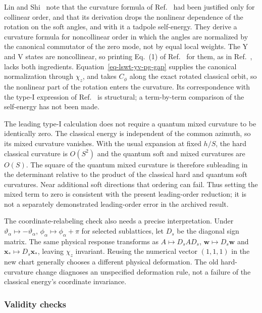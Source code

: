 Lin and Shi~\cite{lin2025} note that the curvature formula of
Ref.~\cite{rau2018} had been justified only for collinear order, and
that its derivation drops the nonlinear dependence of the rotation on
the soft angles, and with it a tadpole self-energy. They derive a
curvature formula for noncollinear order in which the angles are
normalized by the canonical commutator of the zero mode, not by equal
local weights. The Y and V states are noncollinear, so printing
Eq.~(1) of Ref.~\cite{rau2018} for them, as in Ref.~\cite{park2026},
lacks both ingredients. Equation~\eqref{eq-lswt-yv-pg-gap} supplies the
canonical normalization through \(\chi_z\), and takes \(C_\phi\) along
the exact rotated classical orbit, so the nonlinear part of the
rotation enters the curvature. Its correspondence with the type-I
expression of Ref.~\cite{lin2025} is structural; a term-by-term
comparison of the self-energy has not been made.

The leading type-I calculation does not require a quantum mixed
curvature to be identically zero. The classical energy is independent of
the common azimuth, so its mixed curvature vanishes. With the usual
expansion at fixed \(h/S\), the hard classical curvature is \(O(S^2)\)
and the quantum soft and mixed curvatures are \(O(S)\). The square of
the quantum mixed curvature is therefore subleading in the determinant
relative to the product of the classical hard and quantum soft
curvatures. Near additional soft directions that ordering can fail. Thus
setting the mixed term to zero is consistent with the present
leading-order reduction; it is not a separately demonstrated
leading-order error in the archived result.

The coordinate-relabeling check also needs a precise interpretation.
Under \(\vartheta_\alpha\mapsto-\vartheta_\alpha\),
\(\phi_\alpha\mapsto\phi_\alpha+\pi\) for selected sublattices, let
\(D_s\) be the diagonal sign matrix. The same physical response
transforms as \(A\mapsto D_sAD_s\), \(\mathbf w\mapsto D_s\mathbf w\)
and \(\mathbf x_*\mapsto D_s\mathbf x_*\), leaving \(\chi_z\) invariant.
Reusing the numerical vector \((1,1,1)\) in the new chart generally
chooses a different physical deformation. The old hard-curvature change
diagnoses an unspecified deformation rule, not a failure of the
classical energy's coordinate invariance.

\subsubsection{Validity checks}\label{sec-nbcp-gap-validity}

